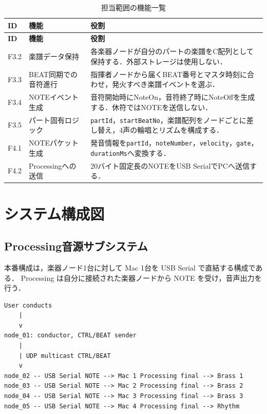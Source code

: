 \documentclass[lualatex,book,paper=a4paper,jafontsize=11.5pt,jafontscale=1.05]{jlreq}
\newcommand{\code}[1]{\texttt{#1}}
\begin{document}
\begin{longtable}{p{}p{}p{}}
\caption{担当範囲の機能一覧}\label{tab:functions}\\
\toprule
\textbf{ID} & \textbf{機能} & \textbf{役割} \\
\midrule
\endfirsthead
\toprule
\textbf{ID} & \textbf{機能} & \textbf{役割} \\
\midrule
\endhead
F3.2 & 楽譜データ保持 &
各楽器ノードが自分のパートの楽譜をC配列として保持する．外部ストレージは使用しない．\\
F3.3 & BEAT同期での音符進行 &
指揮者ノードから届くBEAT番号とマスタ時刻に合わせ，発火すべき楽譜イベントを選ぶ．\\
F3.4 & NOTEイベント生成 &
音符開始時にNoteOn，音符終了時にNoteOffを生成する．休符ではNOTEを送信しない．\\
F3.5 & パート固有ロジック &
\code{partId}，\code{startBeatNo}，楽譜配列をノードごとに差し替え，4声の輪唱とリズムを構成する．\\
F4.1 & NOTEパケット生成 &
発音情報を\code{partId}，\code{noteNumber}，\code{velocity}，\code{gate}，
\code{durationMs}へ変換する．\\
F4.2 & Processingへの送信 &
20バイト固定長のNOTEをUSB SerialでPCへ送信する．\\
\bottomrule
\end{longtable}



\section{システム構成図}
\subsection{Processing音源サブシステム}
本番構成は，楽器ノード1台に対して Mac 1台を USB Serial で直結する構成である．
Processing は自分に接続された楽器ノードから NOTE を受け，音声出力を行う．

\begin{lstlisting}[style=textdiagram, caption={Processing 音源サブシステムを含む全体構成}, label={lst:overview}]
User conducts
    |
    v
node_01: conductor, CTRL/BEAT sender
    |
    | UDP multicast CTRL/BEAT
    v
node_02 -- USB Serial NOTE --> Mac 1 Processing final --> Brass 1
node_03 -- USB Serial NOTE --> Mac 2 Processing final --> Brass 2
node_04 -- USB Serial NOTE --> Mac 3 Processing final --> Brass 3
node_05 -- USB Serial NOTE --> Mac 4 Processing final --> Rhythm
\end{lstlisting}
\end{document}
